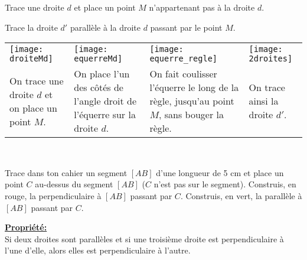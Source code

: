 \begin{methode*1}

\begin{exemple*1}
Trace une droite $d$ et place un point $M$ n'appartenant pas à la droite $d$.

Trace la droite $d'$ parallèle à la droite $d$ passant par le point $M$. \\[0.75em]

\begin{tabularx}{\textwidth}{X|X|X|X}
\texttt{[image: droiteMd]} &  \texttt{[image: equerreMd]} & \texttt{[image: equerre\_regle]} &  \texttt{[image: 2droites]}\\ 
On trace une droite $d$ et on place un point $M$. & On place l'un des côtés de l'angle droit de l'équerre sur la droite $d$. & On fait coulisser l'équerre le long de la règle, jusqu'au point $M$, sans bouger la règle. & On trace ainsi la droite $d'$.\\
\end{tabularx} \\
 \end{exemple*1}

\exercice

Trace dans ton cahier un segment $[AB]$ d'une longueur de 5 cm et place un point $C$ au-dessus du segment $[AB]$ ($C$ n'est pas sur le segment). Construis, en rouge, la perpendiculaire à $[AB]$ passant par $C$. Construis, en vert, la parallèle à $[AB]$ passant par $C$.

\end{methode*1}

\begin{aconnaitre}
\textbf{\underline{Propriété:}}\\
Si deux droites sont parallèles et si une troisième droite est perpendiculaire à l'une d'elle, alors elles est perpendiculaire à l'autre.
\end{aconnaitre}

